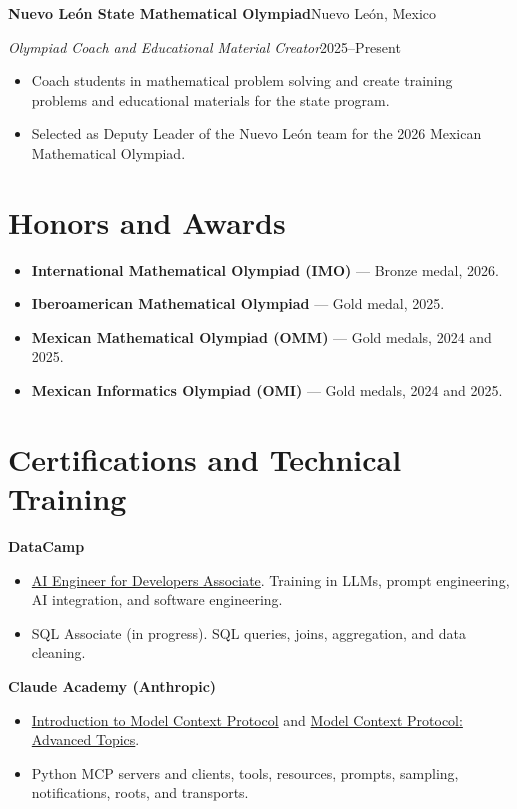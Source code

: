\documentclass[11pt,letterpaper]{article}
\newcommand{\entry}[2]{\textbf{#1}\hfill #2\par}
\begin{document}
\entry{Nuevo León State Mathematical Olympiad}{Nuevo León, Mexico}
\textit{Olympiad Coach and Educational Material Creator}\hfill 2025--Present
\begin{itemize}
\item Coach students in mathematical problem solving and create training problems and educational materials for the state program.
\item Selected as Deputy Leader of the Nuevo León team for the 2026 Mexican Mathematical Olympiad.
\end{itemize}

\section*{Honors and Awards}
\begin{itemize}
\item \textbf{International Mathematical Olympiad (IMO)} --- Bronze medal, 2026.
\item \textbf{Iberoamerican Mathematical Olympiad} --- Gold medal, 2025.
\item \textbf{Mexican Mathematical Olympiad (OMM)} --- Gold medals, 2024 and 2025.
\item \textbf{Mexican Informatics Olympiad (OMI)} --- Gold medals, 2024 and 2025.
\end{itemize}

\section*{Certifications and Technical Training}
\textbf{DataCamp}
\begin{itemize}
\item \href{https://www.datacamp.com/certification/ai-engineer-for-developers-associate}{AI Engineer for Developers Associate}. Training in LLMs, prompt engineering, AI integration, and software engineering.
\item SQL Associate (in progress). SQL queries, joins, aggregation, and data cleaning.
\end{itemize}
\textbf{Claude Academy (Anthropic)}
\begin{itemize}
\item \href{https://academy.claude.com/courses/introduction-to-model-context-protocol}{Introduction to Model Context Protocol} and \href{https://academy.claude.com/courses/model-context-protocol-advanced-topics}{Model Context Protocol: Advanced Topics}.
\item Python MCP servers and clients, tools, resources, prompts, sampling, notifications, roots, and transports.
\end{itemize}
\end{document}
